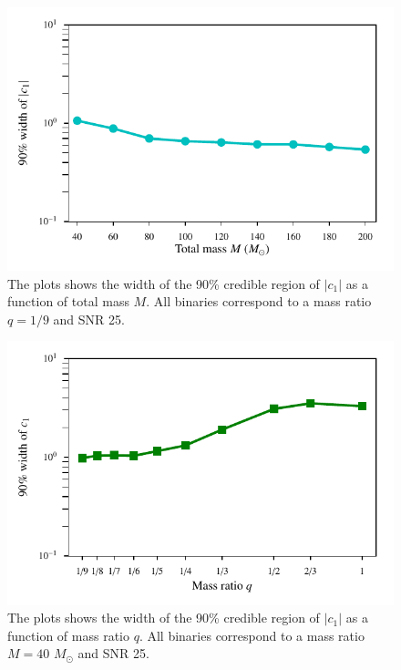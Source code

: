 \documentclass[prd,preprintnumbers,twocolumn,eqsecnum,floatfix,a4paper,nofootinbib,superscriptaddress]{revtex4}
\begin{document}
\begin{figure}[h]
    \begin{center}
    \includegraphics[scale=0.75]{figs/confidence_interval_c1_varying_M_q_9_snr_25.pdf} 
    \end{center} 
    \caption{The plots shows the width of the 90\% credible region of $|c_1|$ as a function of total mass $M$. All binaries correspond to a mass ratio $q = 1/9$ and SNR 25.}
    \label{fig:c1_bound_a}
\end{figure}

\begin{figure}[h]
    \begin{center}
    \includegraphics[scale=0.75]{figs/confidence_interval_c1_varying_q_M_40_snr_25.pdf} 
    \end{center} 
    \caption{The plots shows the width of the 90\% credible region of $|c_1|$ as a function of mass ratio $q$. All binaries correspond to a mass ratio $M = 40$ $M_{\odot}$ and SNR 25.}
    \label{fig:c1_bound_b}
\end{figure}
\end{document}
